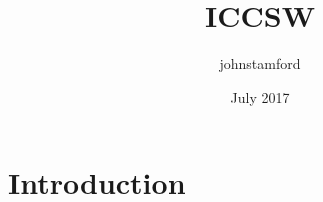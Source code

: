 \documentclass{article}
\title{ICCSW}
\author{johnstamford }
\date{July 2017}
\begin{document}
\maketitle

\section{Introduction}
\end{document}

